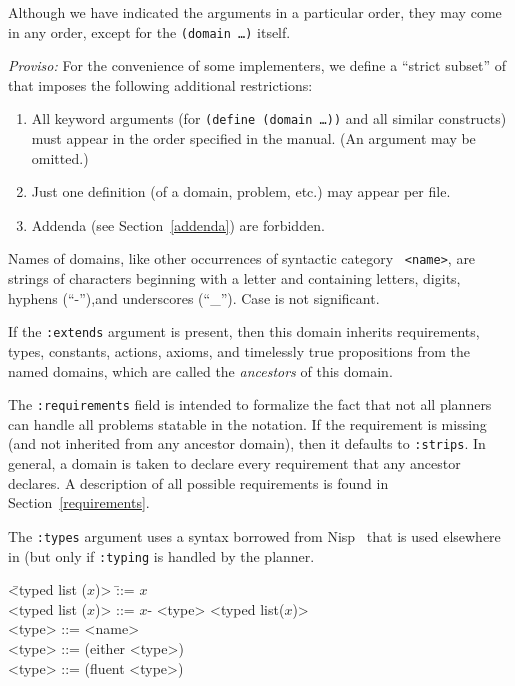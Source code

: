 Although we have indicated the arguments in a particular order, they may come
in any order, except for the {\tt (domain \ldots)} itself.

{\em Proviso:} For the convenience of some implementers, we define a
``strict subset'' of \lang{} that imposes the following additional
restrictions: 
\begin{enumerate}
\item All  keyword arguments (for {\tt (define (domain \ldots))} and
all similar constructs) must appear in the order specified in the
manual.  (An argument may be omitted.)
\item Just one \lang{} definition (of a domain, problem, etc.) may
appear per file.
\item Addenda (see Section~\ref{addenda}) are forbidden.
\end{enumerate}

Names of domains, like other occurrences of syntactic category {\tt
<name>}, are strings of characters beginning with a letter and
containing letters, digits, hyphens (``-''),and underscores (``\_'').
Case is not significant.  

If the {\tt :extends} argument is present, then this domain inherits requirements,
types, constants,
actions, axioms, and timelessly true propositions from the named domains, which
are called the {\em ancestors} of this domain. 

The {\tt :requirements} field is intended to formalize the fact that not all
planners can handle all problems statable in the \lang{} notation.  If the
requirement is missing (and not inherited from any ancestor domain), then it
defaults to {\tt :strips}.  In general, a domain is taken to 
declare every requirement that
any ancestor declares.   A description of all possible requirements is
found in Section~\ref{requirements}.

The {\tt :types} argument uses a syntax borrowed from Nisp~\cite{mcdermott88} that
is used elsewhere in \lang{} (but only if {\tt :typing} is handled by the
planner.

\begin{nopagebreak}\begin{tabtt}
\bump\=  <typed list ($x$)> \=::= $x$\zom\+\\
  <typed list ($x$)> \>::= $x$\oom - <type> <typed list($x$)>\\
  <type>\> ::= <name> \\
  <type> \> ::= (either <type>\oom) \\
  <type> \> ::= (fluent <type>)
\end{tabtt}\end{nopagebreak}

